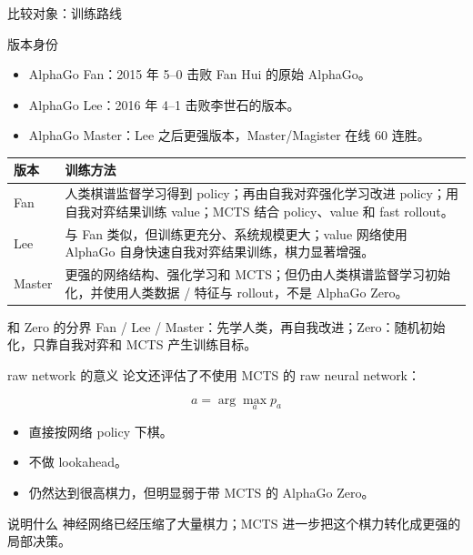 \documentclass[UTF8,aspectratio=169,10pt]{ctexbeamer}
\begin{document}
\begin{frame}{比较对象：训练路线}
  \scriptsize
  \begin{block}{版本身份}
    \begin{itemize}
      \item AlphaGo Fan：2015 年 5--0 击败 Fan Hui 的原始 AlphaGo。
      \item AlphaGo Lee：2016 年 4--1 击败李世石的版本。
      \item AlphaGo Master：Lee 之后更强版本，Master/Magister 在线 60 连胜。
    \end{itemize}
  \end{block}

  \begin{center}
    \begin{tabular}{@{}p{}p{}@{}}
      \toprule
      版本 & 训练方法 \\
      \midrule
      Fan &
      人类棋谱监督学习得到 policy；再由自我对弈强化学习改进 policy；用自我对弈结果训练 value；MCTS 结合 policy、value 和 fast rollout。 \\
      Lee &
      与 Fan 类似，但训练更充分、系统规模更大；value 网络使用 AlphaGo 自身快速自我对弈结果训练，棋力显著增强。 \\
      Master &
      更强的网络结构、强化学习和 MCTS；但仍由人类棋谱监督学习初始化，并使用人类数据 / 特征与 \mbox{rollout}，不是 AlphaGo Zero。 \\
      \bottomrule
    \end{tabular}
  \end{center}

  \begin{alertblock}{和 Zero 的分界}
    Fan / Lee / Master：先学人类，再自我改进；Zero：随机初始化，只靠自我对弈和 MCTS 产生训练目标。
  \end{alertblock}
\end{frame}

\begin{frame}{raw network 的意义}
  论文还评估了不使用 MCTS 的 raw neural network：

  \[
    a=\arg\max_a p_a
  \]

  \begin{itemize}
    \item 直接按网络 policy 下棋。
    \item 不做 lookahead。
    \item 仍然达到很高棋力，但明显弱于带 MCTS 的 AlphaGo Zero。
  \end{itemize}

  \begin{block}{说明什么}
    神经网络已经压缩了大量棋力；MCTS 进一步把这个棋力转化成更强的局部决策。
  \end{block}
\end{frame}
\end{document}
